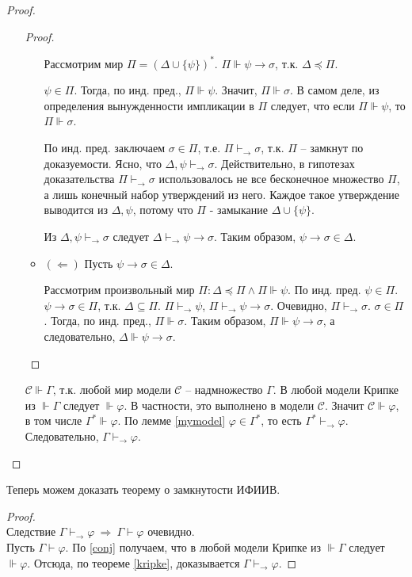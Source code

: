 \begin{proof}
\begin{itemize}
\begin{proof}
\begin{itemize}
				Рассмотрим мир $\Pi = (\Delta \cup \{\psi\})^*$. $\Pi \Vdash \psi \rightarrow \sigma$, т.к. $\Delta \preccurlyeq \Pi$.
				
				$\psi \in \Pi$. Тогда, по инд. пред., $\Pi \Vdash \psi$. Значит, $\Pi \Vdash \sigma$. В самом деле, из определения вынужденности импликации в $\Pi$ следует, что если $\Pi \Vdash \psi$, то $\Pi \Vdash \sigma$.
				
				По инд. пред. заключаем $\sigma \in \Pi$, т.е. $\Pi \vdash_\rightarrow \sigma$, т.к. $\Pi$ -- замкнут по доказуемости. Ясно, что $\Delta, \psi \vdash_\rightarrow \sigma$. Действительно, в гипотезах доказательства $\Pi \vdash_\rightarrow \sigma$ использовалось не все бесконечное множество $\Pi$, а лишь конечный набор утверждений из него. Каждое такое утверждение выводится из $\Delta, \psi$, потому что $\Pi$ - замыкание $\Delta \cup \{\psi\}$. 
				
				Из $\Delta, \psi \vdash_\rightarrow \sigma$ следует $\Delta \vdash_\rightarrow \psi \rightarrow \sigma$. Таким образом, $\psi \rightarrow \sigma \in \Delta$.
				
				\item $(\Leftarrow)$ Пусть $\psi \rightarrow \sigma \in \Delta$.
				
				Рассмотрим произвольный мир $\Pi: \Delta \preccurlyeq \Pi \land \Pi \Vdash \psi$. По инд. пред. $\psi \in \Pi$. $\psi \rightarrow \sigma \in \Pi$, т.к. $\Delta \subseteq \Pi$. $\Pi \vdash_\rightarrow \psi$, $\Pi \vdash_\rightarrow \psi \rightarrow \sigma$. Очевидно, $\Pi \vdash_\rightarrow \sigma$. $\sigma \in \Pi$. Тогда, по инд. пред., $\Pi \Vdash \sigma$. Таким образом, $\Pi \Vdash \psi \rightarrow \sigma$, а следовательно, $\Delta \Vdash \psi \rightarrow \sigma$.
			\end{itemize}
		\end{proof}
		$\mathcal C \Vdash \Gamma$, т.к. любой мир модели $\mathcal C$ -- надмножество $\Gamma$. В любой модели Крипке из $\Vdash \Gamma$ следует $\Vdash \varphi$. В частности, это выполнено в модели $\mathcal C$. Значит $\mathcal C \Vdash \varphi$, в том числе $\Gamma^* \Vdash \varphi$. По лемме \ref{mymodel} $\varphi \in \Gamma^*$, то есть $\Gamma^* \vdash_\rightarrow \varphi$. Следовательно, $\Gamma \vdash_\rightarrow \varphi$.
	\end{itemize}
\end{proof}

Теперь можем доказать теорему о замкнутости ИФИИВ.
\begin{proof}\ \\
	Следствие $\Gamma \vdash_\rightarrow \varphi \ \Rightarrow \ \Gamma \vdash \varphi$ очевидно.\\
	Пусть $\Gamma \vdash \varphi$. По \ref{conj} получаем, что в любой модели Крипке из $\Vdash \Gamma$ следует $\Vdash \varphi$. Отсюда, по теореме \ref{kripke}, доказывается $\Gamma \vdash_\rightarrow \varphi$.
\end{proof}


